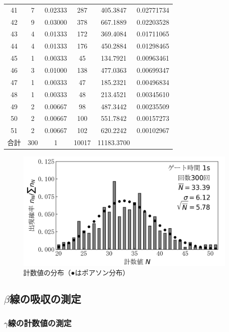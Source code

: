 \documentclass{jarticle}
\begin{document}
\begin{table}[H]
\begin{tabular}{cccccc}
    41 & 7 & 0.02333 & 287 & 405.3847 & 0.02771734 \\
    42 & 9 & 0.03000 & 378 & 667.1889 & 0.02203528 \\
    43 & 4 & 0.01333 & 172 & 369.4084 & 0.01711065 \\
    44 & 4 & 0.01333 & 176 & 450.2884 & 0.01298465 \\
    45 & 1 & 0.00333 & 45 & 134.7921 & 0.00963461 \\
    46 & 3 & 0.01000 & 138 & 477.0363 & 0.00699347 \\
    47 & 1 & 0.00333 & 47 & 185.2321 & 0.00496834 \\
    48 & 1 & 0.00333 & 48 & 213.4521 & 0.00345610 \\
    49 & 2 & 0.00667 & 98 & 487.3442 & 0.00235509 \\
    50 & 2 & 0.00667 & 100 & 551.7842 & 0.00157273 \\
    51 & 2 & 0.00667 & 102 & 620.2242 & 0.00102967 \\
    \hline
    合計 & 300 & 1 & 10017 & 11183.3700 & \\
    \hline
    \end{tabular}
\end{table}

\begin{figure}[H]
  \begin{center}
    \includegraphics[width=110mm]{graph/count-distribution-30mm-300times.png}
    \caption{計数値の分布（●はポアソン分布）}
    \label{fg:count-distribution-30mm-300times}
  \end{center}
\end{figure}


\subsection{$\beta$線の吸収の測定}


\subsubsection{$\gamma$線の計数値の測定}
\end{document}
